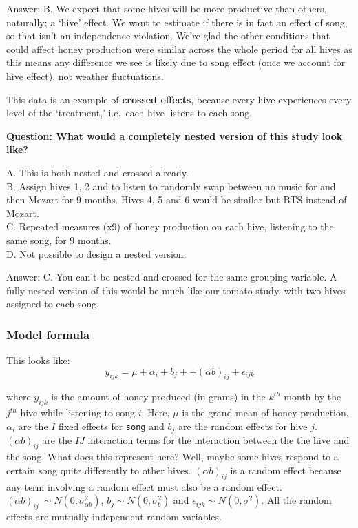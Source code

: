 \documentclass[
  openany]{book}
\begin{document}
Answer: B. We expect that some hives will be more productive than others, naturally; a `hive' effect. We want to estimate if there is in fact an effect of song, so that isn't an independence violation. We're glad the other conditions that could affect honey production were similar across the whole period for all hives as this means any difference we see is likely due to song effect (once we account for hive effect), not weather fluctuations.

This data is an example of \textbf{crossed effects}, because every hive experiences every level of the `treatment,' i.e.~each hive listens to each song.

\textbf{Question: What would a completely nested version of this study look like?}

A. This is both nested and crossed already.\\
B. Assign hives 1, 2 and to listen to randomly swap between no music for and then Mozart for 9 months. Hives 4, 5 and 6 would be similar but BTS instead of Mozart.\\
C. Repeated measures (x9) of honey production on each hive, listening to the same song, for 9 months.\\
D. Not possible to design a nested version.

Answer: C. You can't be nested and crossed for the same grouping variable. A fully nested version of this would be much like our tomato study, with two hives assigned to each song.

\hypertarget{model-formula-1}{%
\subsubsection{Model formula}\label{model-formula-1}}

This looks like:
\[ y_{ijk} = \mu + \alpha_i + b_{j} + + (\alpha b)_{ij} + \epsilon_{ijk}\]

where \(y_{ijk}\) is the amount of honey produced (in grams) in the \(k^{th}\) month by the \(j^{th}\) hive while listening to song \(i\). Here, \(\mu\) is the grand mean of honey production, \(\alpha_i\) are the \(I\) fixed effects for \texttt{song} and \(b_j\) are the random effects for hive \(j\). \((\alpha b)_{ij}\) are the \(IJ\) interaction terms for the interaction between the the hive and the song. What does this represent here? Well, maybe some hives respond to a certain song quite differently to other hives. \((\alpha b)_{ij}\) is a random effect because any term involving a random effect must also be a random effect. \((\alpha b)_{ij} ~ \sim N(0, \sigma^2_{\alpha b})\), \(b_j \sim N(0, \sigma_b^2)\) and \(\epsilon_{ijk} \sim N(0, \sigma^2)\). All the random effects are mutually independent random variables.
\end{document}
